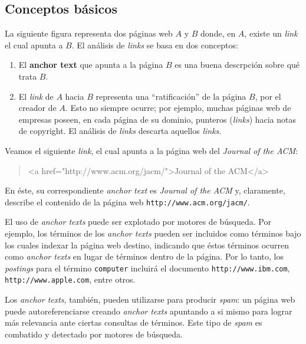 	\subsection{Conceptos básicos}
		La siguiente figura representa dos páginas web $A$ y $B$ donde, en $A$, existe un \textit{link} el cual apunta a $B$. El análisis de \textit{links} se basa en dos conceptos:
		\begin{enumerate}
			\item El \textbf{anchor text} que apunta a la página $B$ es una buena descrpción sobre qué trata $B$.
			\item El \textit{link} de $A$ hacia $B$ representa una \enquote{ratificación} de la página $B$, por el creador de $A$. Esto no siempre ocurre; por ejemplo, muchas páginas web de empresas poseen, en cada página de su dominio, punteros (\textit{links}) hacia notas de copyright. El análisis de \textit{links} descarta aquellos \textit{links}.
		\end{enumerate}
		
		
		Veamos el siguiente \textit{link}, el cual apunta a la página web del \textit{Journal of the ACM}:
		\begin{quote}
			\begin{ttfamily}
				<a href="http://www.acm.org/jacm/">Journal of the ACM</a>
			\end{ttfamily}
		\end{quote}
		En éste, su correspondiente \textit{anchor text} es \textit{Journal of the ACM} y, claramente, describe el contenido de la página web \texttt{http://www.acm.org/jacm/}. \par
		
		El uso de \textit{anchor texts} puede ser explotado por motores de búsqueda. Por ejemplo, los términos de los \textit{anchor texts} pueden ser incluidos como términos bajo los cuales indexar la página web destino, indicando que éstos términos ocurren como \textit{anchor texts} en lugar de términos dentro de la página. Por lo tanto, los \textit{postings} para el término \texttt{computer} incluirá el documento \texttt{http://www.ibm.com}, \texttt{http://www.apple.com}, entre otros. \par
		
		Los \textit{anchor texts}, también, pueden utilizarse para producir \textit{spam}: un página web puede autoreferenciarse creando \textit{anchor texts} apuntando a si mismo para lograr más relevancia ante ciertas consultas de términos. Este tipo de \textit{spam} es combatido y detectado por motores de búsqueda.
		
